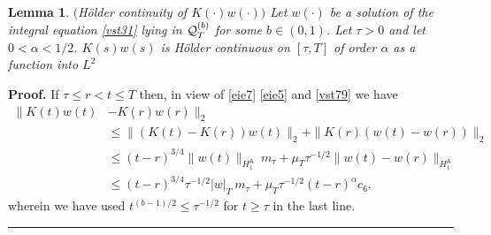 \documentclass[12pt]{article}
\newtheorem{lemma}[theorem]{Lemma}
\newenvironment{proof}[1][Proof]{\textbf{#1.} }{\ \rule{0.5em}{0.5em}}
\def \As{\mathsf{A}}
\def \Q{{\cal Q}}
\def \eref{\eqref}
\numberwithin{equation}{section}
\begin{document}
\begin{lemma}\label{lemholdKw} $($H\"older continuity of $K(\cdot) w(\cdot)$$)$
 Let $w(\cdot)$ be a solution
of the integral equation \eref{vst31} lying in $\Q_T^{(b)}$ for some $b \in (0, 1)$. 
Let $\tau >0$ and let $0 < \alpha < 1/2$.   
$K(s)w(s)$ is H\"older continuous on $[\tau, T]$ of order $\alpha$ as a function into $L^2$ 
\end{lemma}
     \begin{proof} If $\tau \le r < t \le T$ then, in view of \eref{eie7}  
     \eref{eie5}  and \eref{vst79}
      we have
      \begin{align*}
  \|K(t)w(t) &- K(r)w(r)\|_{2} \\
    & \le \| (K(t) - K(r))w(t)\|_{2} + \|K(r)(w(t) - w(r))\|_{2} \\
    &\le (t-r)^{3/4} \|w(t)\|_{H_1^\As}\ m_\tau  +  \mu_T \tau^{-1/2} 
     \|w(t) -w(r)\|_{H_1^\As}\\
    & \le(t-r)^{3/4} \tau^{-1/2} |w|_T\ m_\tau   +\mu_T \tau^{-1/2}(t-r)^\alpha  c_6.               
        \end{align*}
        wherein we have used $t^{(b-1)/2} \le \tau^{-1/2}$ for $t \ge \tau$ in the last line.   
  \end{proof} 
\end{document}
